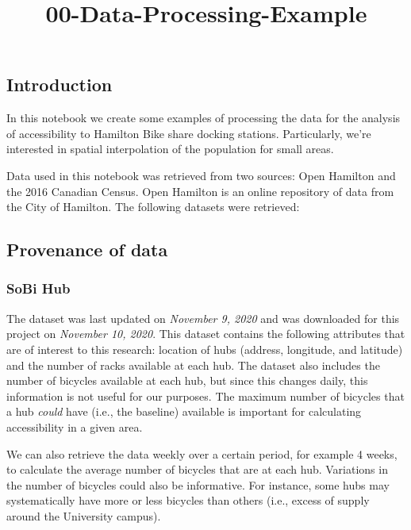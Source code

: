 \documentclass[
]{article}
\title{00-Data-Processing-Example}
\author{}
\date{\vspace{-2.5em}}
\begin{document}
\maketitle

\hypertarget{introduction}{%
\subsection{Introduction}\label{introduction}}

In this notebook we create some examples of processing the data for the
analysis of accessibility to Hamilton Bike share docking stations.
Particularly, we're interested in spatial interpolation of the
population for small areas.

Data used in this notebook was retrieved from two sources: Open Hamilton
and the 2016 Canadian Census. Open Hamilton is an online repository of
data from the City of Hamilton. The following datasets were retrieved:

\hypertarget{provenance-of-data}{%
\subsection{Provenance of data}\label{provenance-of-data}}

\hypertarget{sobi-hub}{%
\subsubsection{SoBi Hub}\label{sobi-hub}}

The dataset was last updated on \emph{November 9, 2020} and was
downloaded for this project on \emph{November 10, 2020}. This dataset
contains the following attributes that are of interest to this research:
location of hubs (address, longitude, and latitude) and the number of
racks available at each hub. The dataset also includes the number of
bicycles available at each hub, but since this changes daily, this
information is not useful for our purposes. The maximum number of
bicycles that a hub \emph{could} have (i.e., the baseline) available is
important for calculating accessibility in a given area.

We can also retrieve the data weekly over a certain period, for example
4 weeks, to calculate the average number of bicycles that are at each
hub. Variations in the number of bicycles could also be informative. For
instance, some hubs may systematically have more or less bicycles than
others (i.e., excess of supply around the University campus).
\end{document}
